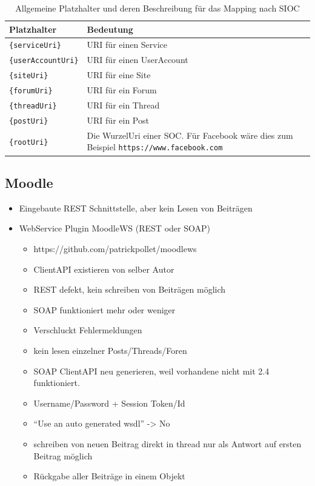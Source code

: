 \begin{table}[h]
    \centering
    \caption{Allgemeine Platzhalter und deren Beschreibung für das Mapping nach SIOC}
    \begin{tabular}{l|p{11cm}}
        \textbf{Platzhalter} & \textbf{Bedeutung} \\ 
        \hline
        \texttt{\{serviceUri\}} & URI für einen Service \\
        \texttt{\{userAccountUri\}} & URI für einen UserAccount \\
        \texttt{\{siteUri\}} & URI für eine Site \\
        \texttt{\{forumUri\}} & URI für ein Forum \\
        \texttt{\{threadUri\}} & URI für ein Thread \\
        \texttt{\{postUri\}} & URI für ein Post \\
        \texttt{\{rootUri\}} & Die WurzelUri einer SOC. Für Facebook wäre dies zum Beispiel \texttt{https://www.facebook.com}
    \end{tabular}
    \label{tbl:platzhalter_fuer_sioc_mapping}
\end{table}

\subsection{Moodle} %
\label{sub:moodle_connector}

\begin{itemize}
    \item Eingebaute REST Schnittstelle, aber kein Lesen von Beiträgen
    \item WebService Plugin MoodleWS (REST oder SOAP)
    \begin{itemize}
        \item https://github.com/patrickpollet/moodlews
        \item ClientAPI existieren von selber Autor
        \item REST defekt, kein schreiben von Beiträgen möglich
        \item SOAP funktioniert mehr oder weniger
        \item Verschluckt Fehlermeldungen
        \item kein lesen einzelner Posts/Threads/Foren
        \item SOAP ClientAPI neu generieren, weil vorhandene nicht mit 2.4 funktioniert.
        \item Username/Password + Session Token/Id
        \item “Use an auto generated wsdl” -> No
        \item schreiben von neuen Beitrag direkt in thread nur als Antwort auf ersten Beitrag möglich
        \item Rückgabe aller Beiträge in einem Objekt
    \end{itemize}
\end{itemize}

